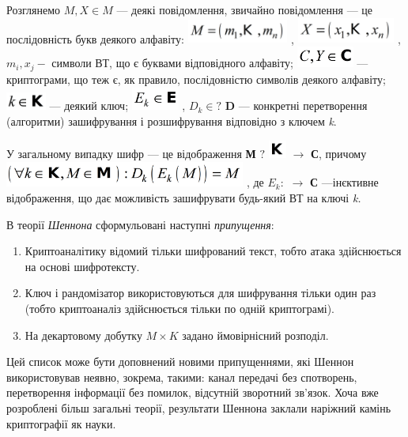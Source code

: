 Розглянемо  $M,X\in M$ --- деякі повідомлення, звичайно повідомлення --- це
послідовність букв  деякого алфавіту: 
\includegraphics[width=1.311in,height=0.3189in]{crypt-img/crypt-img6.png} , 
\includegraphics[width=1.2681in,height=0.3354in]{crypt-img/crypt-img7.png} , 
$m_{i},x_j-$ символи ВТ, що є буквами відповідного алфавіту; 
\includegraphics[width=0.739in,height=0.2709in]{crypt-img/crypt-img8.png}  ---
криптограми, що теж є, як правило, послідовністю символів деякого алфавіту; 
\includegraphics[width=0.5193in,height=0.2311in]{crypt-img/crypt-img9.png}  ---
деякий ключ; 
\includegraphics[width=0.6146in,height=0.3016in]{crypt-img/crypt-img10.png} , 
$D_k\in ?$ \textbf{D} --- конкретні перетворення (алгоритми) зашифрування і
розшифрування відповідно з ключем \textit{k}. 

У загальному випадку шифр --- це відображення \textbf{М} $?$
\includegraphics[width=0.2311in,height=0.2311in]{crypt-img/crypt-img11.png} 
$\rightarrow $\textbf{ С}, причому
\includegraphics[width=3.1173in,height=0.3346in]{crypt-img/crypt-img12.png} , 
де   $E_{k}:$  $\rightarrow $\textbf{ С}
---ін{\textquotesingle}єктивне відображення, що дає можливість зашифрувати 
будь-який ВТ на ключі \textit{k.}

В теорії \textit{Шеннона} сформульовані наступні \textit{припущення}:

\liststyleWWviiiNumxix
\begin{enumerate}
\item Криптоаналітику відомий тільки шифрований текст, тобто атака здійснюється
на основі шифротексту.
\item Ключ і рандомізатор використовуються для шифрування тільки один раз (тобто
криптоаналіз здійснюється тільки по одній криптограмі). 
\item На  декартовому добутку  $M\times K$ задано ймовірнісний розподіл.
\end{enumerate}
 Цей список може бути доповнений новими припущеннями, які Шеннон використовував
неявно, зокрема, такими:  канал передачі без спотворень, перетворення
інформації без помилок, відсутній зворотний зв’язок. Хоча вже розроблені більш
загальні теорії, результати Шеннона заклали наріжний камінь криптографії як
науки.

